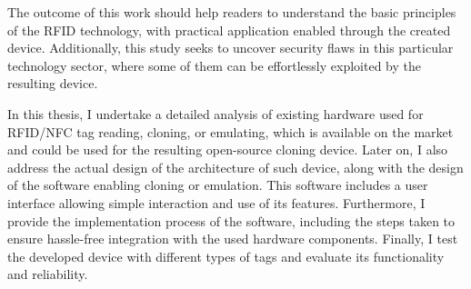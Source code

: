 The outcome of this work should help readers to understand the basic principles of the RFID technology, with practical application enabled through the created device. Additionally, this study seeks to uncover security flaws in this particular technology sector, where some of them can be effortlessly exploited by the resulting device.

In this thesis, I undertake a detailed analysis of existing hardware used for RFID/NFC tag reading, cloning, or emulating, which is available on the market and could be used for the resulting open-source cloning device. Later on, I also address the actual design of the architecture of such device, along with the design of the software enabling cloning or emulation. This software includes a user interface allowing simple interaction and use of its features. Furthermore, I provide the implementation process of the software, including the steps taken to ensure hassle-free integration with the used hardware components. Finally, I test the developed device with different types of tags and evaluate its functionality and reliability.
